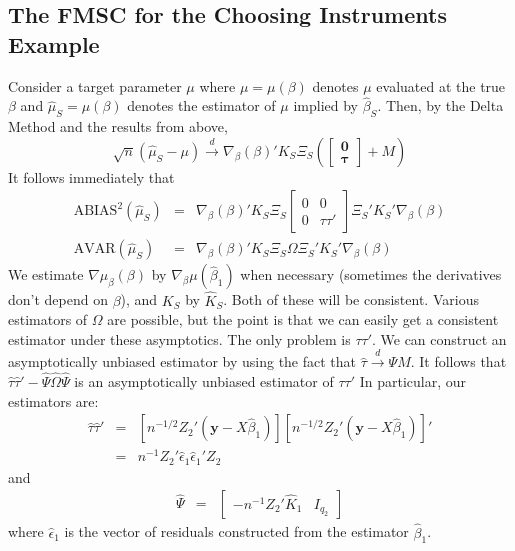 \documentclass[12pt]{article}
\theoremstyle{definition}
\begin{document}
\subsection{The FMSC for the Choosing Instruments Example}
Consider a target parameter $\mu$ where $\mu = \mu(\beta)$ denotes $\mu$ evaluated at the true $\beta$ and $\widehat{\mu}_S = \mu(\beta)$ denotes the estimator of $\mu$ implied by $\widehat{\beta}_S$. Then, by the Delta Method and the results from above,
  $$\sqrt{n}\left( \widehat{\mu}_S - \mu \right) \overset{d}{\rightarrow} \nabla_\beta (\beta)' K_S \Xi_S\left(\left[\begin{array}
           {c} \mathbf{0} \\ \boldsymbol{\tau}
         \end{array}\right] + M \right)$$
It follows immediately that 
  \begin{eqnarray*}
    \mbox{ABIAS}^2(\widehat{\mu}_S) &=&  \nabla_\beta (\beta)' K_S \Xi_S  \left[\begin{array}
      {cc}
      0 & 0 \\ 0 & \tau \tau'
    \end{array} \right]  \Xi_S' K_S' \nabla_\beta (\beta)  \\
    \mbox{AVAR}(\widehat{\mu}_S) &=& \nabla_\beta (\beta)' K_S \Xi_S  \Omega  \Xi_S' K_S' \nabla_\beta (\beta)
  \end{eqnarray*}
We estimate $\nabla\mu_\beta(\beta)$ by $\nabla_\beta\mu(\widehat{\beta}_1)$ when necessary (sometimes the derivatives don't depend on $\beta$), and $K_S$ by $\widehat{K}_S$. Both of these will be consistent. Various estimators of $\Omega$ are possible, but the point is that we can easily get a consistent estimator under these asymptotics. The only problem is $\tau \tau'$. We can construct an asymptotically unbiased estimator by using the fact that $\widehat{\tau} \overset{d}{\rightarrow} \Psi M$. It follows that $\widehat{\tau}\widehat{\tau}' - \widehat{\Psi} \widehat{\Omega} \widehat{\Psi}$ is an asymptotically unbiased estimator of $\tau\tau'$ In particular, our estimators are:
\begin{eqnarray*}
  \widehat{\tau} \widehat{\tau}' &=& \left[n^{-1/2} Z_2'\left(\textbf{y} - X\widehat{\beta}_1\right)\right] \left[n^{-1/2} Z_2'\left(\textbf{y} - X\widehat{\beta}_1\right) \right]'\\
    &=&n^{-1} Z_2' \hat{\epsilon}_1 \hat{\epsilon}_1' Z_2 
\end{eqnarray*}
and
\begin{eqnarray*}
  \widehat{\Psi} &=& \left[ \begin{array}{cc}
      -n^{-1} Z_2' \widehat{K}_1 & I_{q_2}
  \end{array}\right]
\end{eqnarray*}
where $\hat{\epsilon}_1$ is the vector of residuals constructed from the estimator $\widehat{\beta}_1$.
\end{document}
